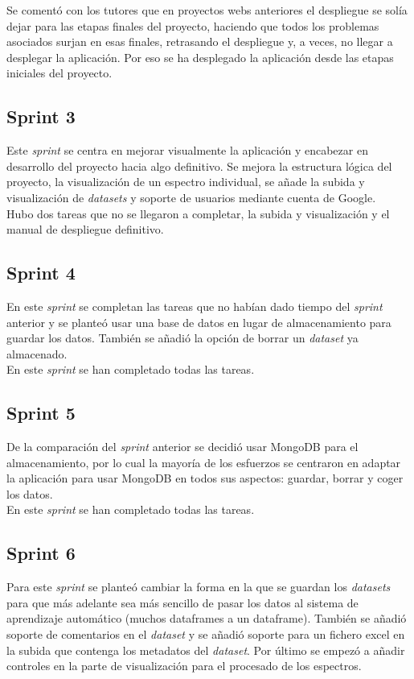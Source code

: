 Se comentó con los tutores que en proyectos webs anteriores el despliegue se solía dejar para las etapas finales del proyecto, haciendo que todos los problemas asociados surjan en esas finales, retrasando el despliegue y, a veces, no llegar a desplegar la aplicación. Por eso se ha desplegado la aplicación desde las etapas iniciales del proyecto.\\

\subsection{Sprint 3}
Este \textit{sprint} se centra en mejorar visualmente la aplicación y encabezar en desarrollo del proyecto hacia algo definitivo. Se mejora la estructura lógica del proyecto, la visualización de un espectro individual, se añade la subida y visualización de \textit{datasets} y soporte de usuarios mediante cuenta de Google.\\

Hubo dos tareas que no se llegaron a completar, la subida y visualización y el manual de despliegue definitivo.\\

\subsection{Sprint 4}
En este \textit{sprint} se completan las tareas que no habían dado tiempo del \textit{sprint} anterior y se planteó usar una base de datos en lugar de almacenamiento para guardar los datos. También se añadió la opción de borrar un \textit{dataset} ya almacenado.\\

En este \textit{sprint} se han completado todas las tareas.\\

\subsection{Sprint 5}
De la comparación del \textit{sprint} anterior se decidió usar MongoDB para el almacenamiento, por lo cual la mayoría de los esfuerzos se centraron en adaptar la aplicación para usar MongoDB en todos sus aspectos: guardar, borrar y coger los datos.\\

En este \textit{sprint} se han completado todas las tareas.\\

\subsection{Sprint 6}
Para este \textit{sprint} se planteó cambiar la forma en la que se guardan los \textit{datasets} para que más adelante sea más sencillo de pasar los datos al sistema de aprendizaje automático (muchos dataframes a un dataframe). También se añadió soporte de comentarios en el \textit{dataset} y se añadió soporte para un fichero excel en la subida que contenga los metadatos del \textit{dataset}. Por último se empezó a añadir controles en la parte de visualización para el procesado de los espectros.\\

